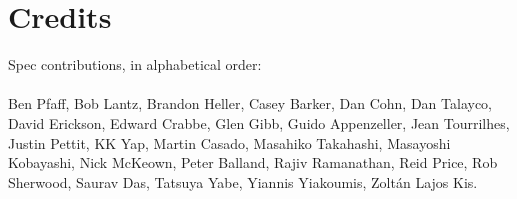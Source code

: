 \section{Credits}

Spec contributions, in alphabetical order:
\\\\
Ben Pfaff,
Bob Lantz,
Brandon Heller,
Casey Barker,
Dan Cohn,
Dan Talayco,
David Erickson,
Edward Crabbe,
Glen Gibb,
Guido Appenzeller,
Jean Tourrilhes,
Justin Pettit,
KK Yap,
Martin Casado,
Masahiko Takahashi,
Masayoshi Kobayashi,
Nick McKeown,
Peter Balland,
Rajiv Ramanathan,
Reid Price,
Rob Sherwood,
Saurav Das,
Tatsuya Yabe,
Yiannis Yiakoumis,
Zolt\'{a}n Lajos Kis.

